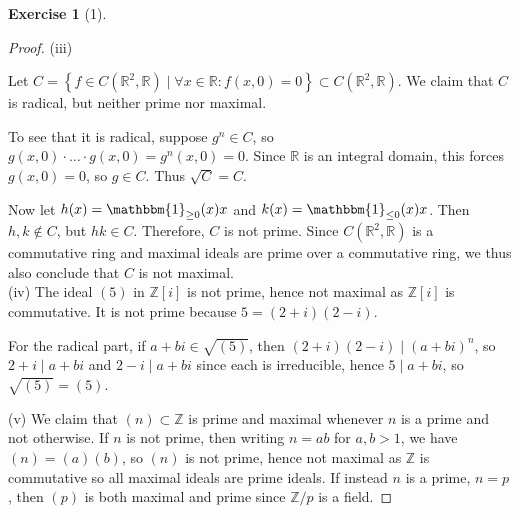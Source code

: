 \documentclass[reqno]{amsart}
\theoremstyle{definition}
\newtheorem{exercise}[theorem]{Exercise}
\theoremstyle{remark}
\begin{document}
\begin{exercise}[1]
\begin{proof}
                    (iii)
                 
                    Let $C =
                    \left\{ f \in 
                    C\left( \mathbb{R}^2,\mathbb{R} \right)
                 \mid \forall x \in \mathbb{R}\colon
             f\left( x,0 \right) =0 \right\}
             \subset C\left( \mathbb{R}^2,\mathbb{R} \right)$.
             We claim that $C$ is radical, but neither
             prime nor maximal.

             To see that it is radical, suppose
             $g^{n} \in C$, so
             $g(x,0) \cdot \ldots \cdot 
             g(x,0) = g^{n}(x,0) = 0$. Since
             $\mathbb{R}$ is an integral domain,
             this forces $g(x,0) = 0$, so
             $g \in C$. Thus $\sqrt{C}  = C$.

             Now let
             $h(x) = \mathbbm{1}_{\ge 0}(x) x $
             and
             $k(x) = \mathbbm{1}_{\le 0}(x) x$. Then
             $h,k \not\in C$, but
             $hk \in C$. Therefore,
             $C$ is not prime.
             Since $C\left( \mathbb{R}^2,\mathbb{R} \right) $ is
             a commutative ring and maximal ideals are
             prime over a commutative ring, we
             thus also conclude that $C$ is not maximal.\\
             \linebreak
             (iv) The ideal $\left( 5 \right) $ in
             $\mathbb{Z}[i]$ is not prime, hence
             not maximal as $\mathbb{Z}[i]$ is commutative.
             It is not prime because $5 = 
             (2+i) (2-i)$.

             For the radical part, if
             $a+bi \in \sqrt{(5)} $, then
             $(2+i)(2-i)  \mid \left( a+bi \right)^{n}$,
             so $2+i  \mid a+bi$ and
             $2-i  \mid a+bi$ since
             each is irreducible, hence
             $5  \mid a+bi$, so
             $\sqrt{\left( 5 \right) } =
             \left( 5 \right) $.\\
             \linebreak
             
             (v) We claim that
             $\left( n \right) \subset \mathbb{Z}$ 
             is prime and maximal whenever
             $n$ is a prime and not otherwise.
             If $n$ is not prime, then
             writing $n = ab$ for $a,b >1$, we
             have $\left( n \right) 
             = \left( a \right) (b)$, so $\left( n \right) $ is
             not prime, hence not maximal as
             $\mathbb{Z}$ is commutative so
             all maximal ideals are prime ideals.
             If instead $n$ is a prime, $n=p$, then
             $\left( p \right) $ is both
             maximal and prime since
             $\mathbb{Z} / p$ is a field.



\end{proof}
\end{exercise}
\end{document}
